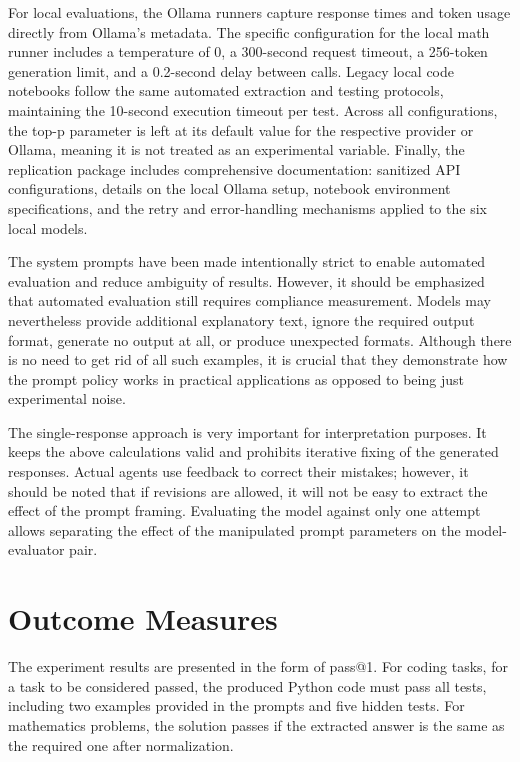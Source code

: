 For local evaluations, the Ollama runners capture response times and token usage directly from Ollama's metadata. The specific configuration for the local math runner includes a temperature of 0, a 300-second request timeout, a 256-token generation limit, and a 0.2-second delay between calls. Legacy local code notebooks follow the same automated extraction and testing protocols, maintaining the 10-second execution timeout per test. Across all configurations, the top-p parameter is left at its default value for the respective provider or Ollama, meaning it is not treated as an experimental variable. Finally, the replication package includes comprehensive documentation: sanitized API configurations, details on the local Ollama setup, notebook environment specifications, and the retry and error-handling mechanisms applied to the six local models.

The system prompts have been made intentionally strict to enable automated evaluation and reduce ambiguity of results. However, it should be emphasized that automated evaluation still requires compliance measurement. Models may nevertheless provide additional explanatory text, ignore the required output format, generate no output at all, or produce unexpected formats. Although there is no need to get rid of all such examples, it is crucial that they demonstrate how the prompt policy works in practical applications as opposed to being just experimental noise.

The single-response approach is very important for interpretation purposes. It keeps the above calculations valid and prohibits iterative fixing of the generated responses. Actual agents use feedback to correct their mistakes; however, it should be noted that if revisions are allowed, it will not be easy to extract the effect of the prompt framing. Evaluating the model against only one attempt allows separating the effect of the manipulated prompt parameters on the model-evaluator pair.

\section{Outcome Measures\label{sec:outcome-measures}}

The experiment results are presented in the form of pass@1. For coding tasks, for a task to be considered passed, the produced Python code must pass all tests, including two examples provided in the prompts and five hidden tests. For mathematics problems, the solution passes if the extracted answer is the same as the required one after normalization.

